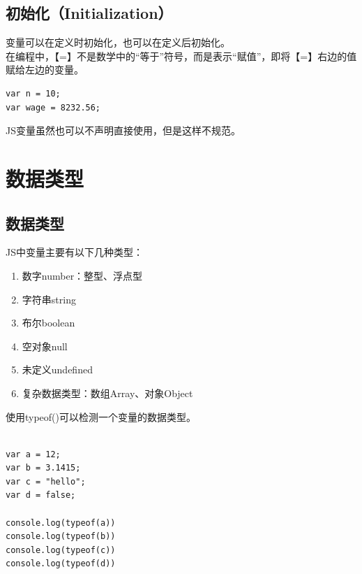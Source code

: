 \vspace{0.5cm}

\subsection{初始化（Initialization）}

变量可以在定义时初始化，也可以在定义后初始化。\\

在编程中，【=】不是数学中的“等于”符号，而是表示“赋值”，即将【=】右边的值赋给左边的变量。\\

\begin{lstlisting}[style=htmlcssjs]
var n = 10;
var wage = 8232.56;
\end{lstlisting}

JS变量虽然也可以不声明直接使用，但是这样不规范。

\newpage

\section{数据类型}

\subsection{数据类型}

JS中变量主要有以下几种类型：

\begin{enumerate}
	\item 数字number：整型、浮点型
	\item 字符串string
	\item 布尔boolean
	\item 空对象null
	\item 未定义undefined
	\item 复杂数据类型：数组Array、对象Object
\end{enumerate}

使用typeof()可以检测一个变量的数据类型。\\

\\

\begin{lstlisting}[style=htmlcssjs]
var a = 12;
var b = 3.1415;
var c = "hello";
var d = false;

console.log(typeof(a))
console.log(typeof(b))
console.log(typeof(c))
console.log(typeof(d))
\end{lstlisting}

